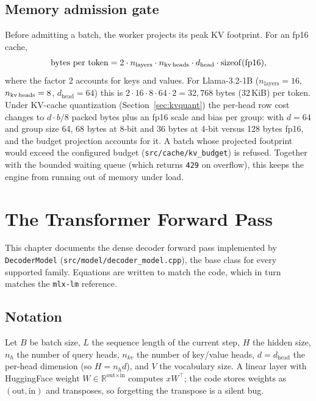 \documentclass[11pt,a4paper]{report}
\newcommand{\R}{\mathbb{R}}
\newcommand{\code}[1]{\texttt{#1}}
\begin{document}
\section{Memory admission gate}
Before admitting a batch, the worker projects its peak KV footprint. For an fp16
cache,
\begin{equation}
  \text{bytes per token} = 2 \cdot n_{\text{layers}} \cdot n_{\text{kv\,heads}}
  \cdot d_{\text{head}} \cdot \mathrm{sizeof}(\text{fp16}),
\end{equation}
where the factor 2 accounts for keys and values. For Llama-3.2-1B
($n_{\text{layers}}=16$, $n_{\text{kv\,heads}}=8$, $d_{\text{head}}=64$) this is
$2\cdot16\cdot8\cdot64\cdot2 = 32{,}768$ bytes ($32$\,KiB) per token. Under KV-cache
quantization (Section~\ref{sec:kvquant}) the per-head row cost changes to
$d\cdot b/8$ packed bytes plus an fp16 scale and bias per group: with $d=64$ and
group size 64, 68 bytes at 8-bit and 36 bytes at 4-bit versus 128 bytes fp16,
and the budget projection accounts for it. A batch whose
projected footprint would exceed the configured budget
(\code{src/cache/kv\_budget}) is refused. Together with the bounded waiting queue
(which returns \code{429} on overflow), this keeps the engine from running out of
memory under load.

\chapter{The Transformer Forward Pass}
\label{ch:forward}

This chapter documents the dense decoder forward pass implemented by
\code{DecoderModel} (\code{src/model/decoder\_model.cpp}), the base class for every
supported family. Equations are written to match the code, which in turn matches
the \code{mlx-lm} reference.

\section{Notation}
Let $B$ be batch size, $L$ the sequence length of the current step, $H$ the hidden
size, $n_h$ the number of query heads, $n_{kv}$ the number of key/value heads,
$d=d_{\text{head}}$ the per-head dimension (so $H = n_h d$), and $V$ the vocabulary
size. A linear layer with HuggingFace weight $W \in \R^{\text{out}\times\text{in}}$
computes $xW^\top$; the code stores weights as $(\text{out},\text{in})$ and
transposes, so forgetting the transpose is a silent bug.
\end{document}
